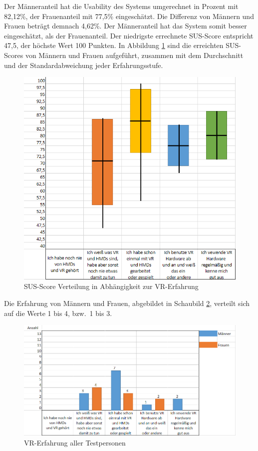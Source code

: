 \noindent Der Männeranteil hat die Usability des Systems umgerechnet in Prozent mit 82,12\%, der Frauenanteil mit 77,5\% eingeschätzt. Die Differenz von Männern und Frauen beträgt demnach 4,62\%. Der Männeranteil hat das System somit besser eingeschätzt, als der Frauenanteil. Der niedrigste errechnete SUS-Score entspricht 47,5, der höchste Wert 100 Punkten. In Abbildung \ref{fig:susscorealler} sind die erreichten SUS-Scores von Männern und Frauen aufgeführt, zusammen mit dem Durchschnitt und der Standardabweichung jeder Erfahrungsstufe.

\begin{figure}[h]
\captionsetup{width=.7\linewidth}
\includegraphics[scale=0.8]{Bilder/Hauptteil/susvrstandardabweichung}
\centering
\caption{SUS-Score Verteilung in Abhängigkeit zur VR-Erfahrung}
\label{fig:susscorealler}
\end{figure}

\noindent Die Erfahrung von Männern und Frauen, abgebildet in Schaubild \ref{fig:vrerfahrung}, verteilt sich auf die Werte 1 bis 4, bzw.~1 bis 3.

\begin{figure}[h]
\captionsetup{width=.7\linewidth}
\includegraphics[scale=0.6]{Bilder/Hauptteil/vrerfahrungalle}
\centering
\caption{VR-Erfahrung aller Testpersonen}
\label{fig:vrerfahrung}
\end{figure}

